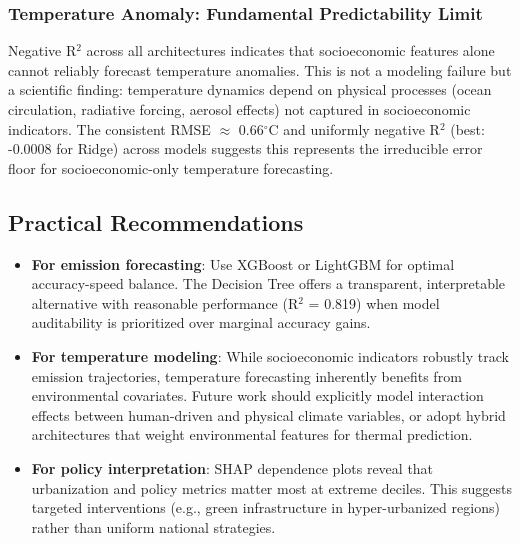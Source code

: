 \documentclass[12pt, a4paper]{article}
\begin{document}
\subsubsection{Temperature Anomaly: Fundamental Predictability Limit}
Negative R$^2$ across all architectures indicates that socioeconomic features alone cannot reliably forecast temperature anomalies. This is not a modeling failure but a scientific finding: temperature dynamics depend on physical processes (ocean circulation, radiative forcing, aerosol effects) not captured in socioeconomic indicators. %
The consistent RMSE $\approx$ 0.66$^\circ$C and uniformly negative R$^2$ (best: -0.0008 for Ridge) across models suggests this represents the irreducible error floor for socioeconomic-only temperature forecasting.

\subsection{Practical Recommendations}
\begin{itemize}[leftmargin=*]
    
\item \textbf{For emission forecasting}: Use XGBoost or LightGBM for optimal accuracy-speed balance. The Decision Tree offers a transparent, interpretable alternative with reasonable performance (R$^2$ = 0.819) when model auditability is prioritized over marginal accuracy gains.
    
\item \textbf{For temperature modeling}: While socioeconomic indicators robustly track emission trajectories, temperature forecasting inherently benefits from environmental covariates. Future work should explicitly model interaction effects between human-driven and physical climate variables, or adopt hybrid architectures that weight environmental features for thermal prediction.
    \item \textbf{For policy interpretation}: SHAP dependence plots reveal that urbanization and policy metrics matter most at extreme deciles. This suggests targeted interventions (e.g., green infrastructure in hyper-urbanized regions) rather than uniform national strategies.
\end{itemize}
\end{document}
